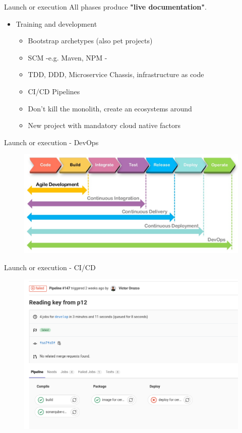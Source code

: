 \documentclass[aspectratio=169]{beamer}
\begin{document}
\begin{frame}{Launch or execution}
All phases produce \textbf{"live documentation"}.

\begin{itemize}

     \item  Training and development
        \begin{itemize}
        \item Bootstrap archetypes (also pet projects)
        \item SCM -e.g. Maven, NPM -
        \item TDD, DDD, Microservice Chassis, infrastructure as code
        \item CI/CD Pipelines
        \item Don't kill the monolith, create an ecosystems around 
        \item New project with mandatory cloud native factors
        \end{itemize}
\end{itemize}

\end{frame}


\begin{frame}{Launch or execution - DevOps}
\begin{figure}
	\centering
	\includegraphics[width=\linewidth]{Images/etapa1}
	\label{fig:etapa1}
\end{figure}
\end{frame}

\begin{frame}{Launch or execution - CI/CD}
\begin{figure}
	\centering
	\includegraphics[width=0.7\linewidth]{Images/cicd}
\end{figure}
\end{frame}
\end{document}
